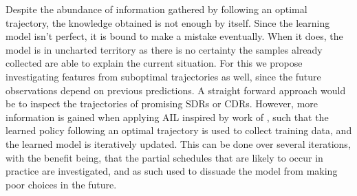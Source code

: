\documentclass[twocolumn]{svjour3}
\begin{document}
Despite the abundance of information gathered by following an optimal 
trajectory, the knowledge obtained is not enough by itself. Since the learning 
model isn't perfect, it is bound to make a mistake eventually. When it does, 
the model is in uncharted territory as there is no certainty the samples 
already collected are able to explain the current situation. For this we 
propose investigating features from suboptimal trajectories as well, since the 
future observations depend on previous predictions. 
A straight forward approach would be to inspect the trajectories of promising 
SDRs or CDRs. However, more information is gained when applying AIL inspired by 
work of \cite{RossB10,RossGB11}, such that the 
learned policy following an optimal trajectory is used to collect training 
data, and the learned model is iteratively updated. 
This can be done over several iterations, with the benefit being, that the 
partial schedules that are likely to occur in practice are investigated, and as 
such used to dissuade the model from making poor choices in the future.
 
\end{document}
